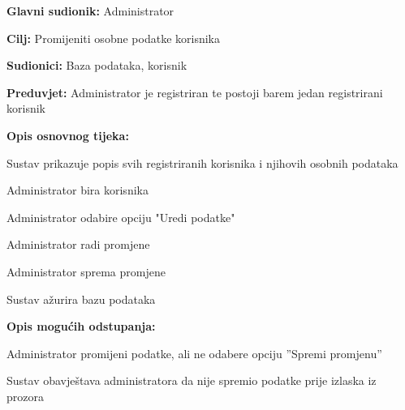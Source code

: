 \begin{packed_item}
\begin{packed_item}
					\noindent {}
					\begin{packed_item}
						
						\item \textbf{Glavni sudionik:} Administrator
						\item \textbf{Cilj:} Promijeniti osobne podatke korisnika
						\item \textbf{Sudionici:} Baza podataka, korisnik 
						\item \textbf{Preduvjet:} Administrator je registriran te postoji barem jedan registrirani korisnik
						\item \textbf{Opis osnovnog tijeka:}
						
						\item[] \begin{packed_enum}
							
							\item Sustav prikazuje popis svih registriranih korisnika i njihovih osobnih podataka
							\item Administrator bira korisnika
							\item Administrator odabire opciju "Uredi podatke"
							\item Administrator radi promjene
							\item Administrator sprema promjene 
							\item Sustav ažurira bazu podataka					
						\end{packed_enum}
						
						\item  \textbf{Opis mogućih odstupanja:}
						
						\item[] \begin{packed_item}
							
							\item[5.a] Administrator promijeni podatke, ali ne odabere opciju ”Spremi promjenu” 
							\item[] \begin{packed_enum}
								
								\item Sustav obavještava administratora da nije spremio podatke prije izlaska iz prozora
								
							\end{packed_enum}
							
						\end{packed_item}
					\end{packed_item}
					

\end{packed_item}
\end{packed_item}
